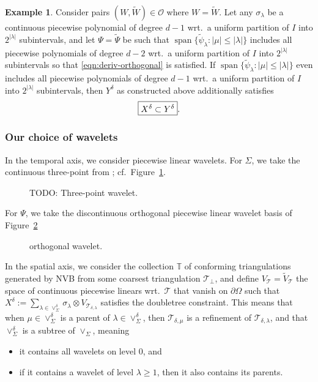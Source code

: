 \documentclass[11pt,a4paper,oneside,english]{amsart}
\numberwithin{equation}{section}
\numberwithin{theorem}{section}
\theoremstyle{definition}
\newtheorem{example}[theorem]{Example}
\DeclareMathOperator{\spann}{span}
\newcommand{\T}{\mathcal{T}}
\newcommand{\jw}[1]{{\color{red}{JW: #1}}}
\begin{document}
\begin{example}
  Consider pairs $(W, \tilde W) \in \mathcal O$ where $W = \tilde W$.
  Let any $\sigma_\lambda$ be a continuous piecewise polynomial of degree $d-1$\jw{voor $d$ de dimensie van je space domain?! of gewoon *een* $d$? in het tweede geval: rename naar $p$?}
  wrt.~a uniform partition of $I$ into $2^{|\lambda|}$ subintervals, and let
  $\Psi=\tilde{\Psi}$ be such that $\spann\{\tilde{\psi}_\lambda : |\mu| \leq |\lambda|\}$
  includes all piecewise polynomials of degree $d-2$ wrt.~a uniform partition
  of $I$ into $2^{|\lambda|}$ subintervals so that \eqref{eqn:deriv-orthogonal}
  is satisfied. If $\spann\{\tilde{\psi}_\lambda : |\mu| \leq |\lambda|\}$ even
  includes all piecewise polynomials of degree $d-1$ wrt.~a uniform partition
  of $I$ into $2^{|\lambda|}$ subintervals, then $Y^\delta$ as constructed above
  additionally satisfies
  \begin{equation}
    \label{eqn:inclusion}
      \framebox{$X^\delta \subset Y^\delta$}.
  \end{equation}
\end{example}

\subsubsection{Our choice of wavelets}
\label{sec:wavelets}
In the temporal axis, we consider piecewise linear wavelets. For $\Sigma$, we take the continuous three-point from \cite{Stevenson1998}; cf.~Figure~\ref{fig:3pt-wavelet}.
\begin{figure}
  \caption{TODO: Three-point wavelet.}
  \label{fig:3pt-wavelet}
\end{figure}

For $\Psi$, we take the discontinuous orthogonal piecewise linear wavelet basis
of Figure~\ref{fig:ortho-wavelet}\jw{again, needs citation; ik kon niks vinden zo 1-2-3;
misschien omdat het niet echt een ``wavelet'' in de typische zin is?}
\begin{figure}
  \caption{orthogonal wavelet.}
  \label{fig:ortho-wavelet}
\end{figure}

In the spatial axis, we consider the collection $\mathbb T$ of conforming
triangulations generated by NVB from some coarsest triangulation $\T_\perp$,
and define $V_\T = \tilde V_\T$ the space of continuous piecewise linears wrt.~$\T$
that vanish on $\partial \Omega$ such that $X^\delta := \sum_{\lambda \in \vee^\delta_\Sigma} \sigma_\lambda \otimes V_{\T_{\delta, \lambda}}$ satisfies the doubletree constraint.
This means that when $\mu \in \vee^\delta_\Sigma$ is a parent of $\lambda \in \vee^\delta_\Sigma$,
    then $\T_{\delta, \mu}$ is a refinement of $\T_{\delta, \lambda}$, and that $\vee^\delta_\Sigma$ is a subtree of $\vee_\Sigma$, meaning
\begin{itemize}
  \item it contains all wavelets on level 0, and
  \item if it contains a wavelet of level $\lambda \geq 1$, then it also contains
    its parents.
\end{itemize}
\end{document}
